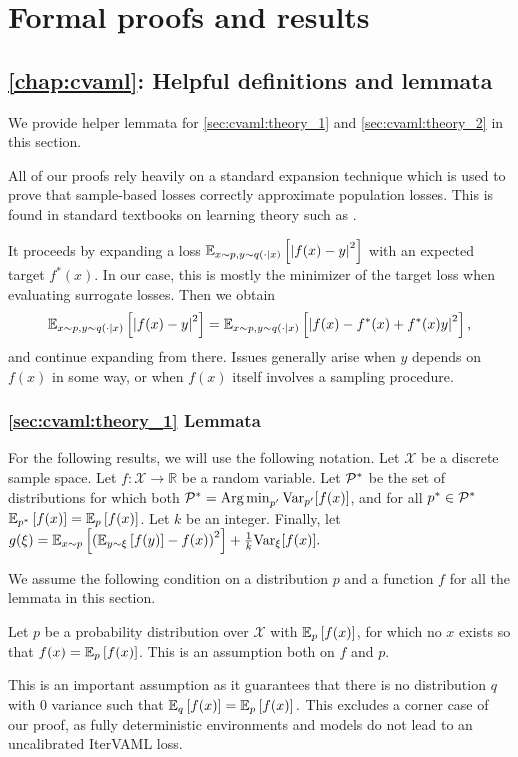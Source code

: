\chapter{Formal proofs and results}
\label{app:proofs}


\section{\autoref{chap:cvaml}: Helpful definitions and lemmata}
\label{app:formal:cvaml}

We provide helper lemmata for \autoref{sec:cvaml:theory_1} and \autoref{sec:cvaml:theory_2} in this section.

All of our proofs rely heavily on a standard expansion technique which is used to prove that sample-based losses correctly approximate population losses.
This is found in standard textbooks on learning theory such as \citet{gyrfi2002adt}. 

It proceeds by expanding a loss $\EEX{x\sim p, y\sim q(\cdot|x)}{\left|f(x) - y\right|^2}$ with an expected target $f^*(x)$.
In our case, this is mostly the minimizer of the target loss when evaluating surrogate losses.
Then we obtain $$\EEX{x\sim p, y\sim q(\cdot|x)}{\left|f(x) - y\right|^2} = \EEX{x\sim p, y\sim q(\cdot|x)}{\left|f(x) - f^*(x) + f^*(x) y\right|^2},$$
and continue expanding from there.
Issues generally arise when $y$ depends on $f(x)$ in some way, or when $f(x)$ itself involves a sampling procedure.

\subsection{\autoref{sec:cvaml:theory_1} Lemmata}

For the following results, we will use the following notation.
Let $\mathcal{X}$ be a discrete sample space. 
Let $f: \mathcal{X} \rightarrow \mathbb{R}$ be a random variable.
Let $\P^*$ be the set of distributions for which both $\P^* = \Argmin_{p'} \mathrm{Var}_{p'}[f(x)]$, and for all $p^* \in \P^*$ $\EEX{p^*}{f(x)} = \EEX{p}{f(x)}$.
Let $k$ be an integer.
Finally, let $g(\xi) = \EEX{x \sim p}{\left(\EEX{y \sim \xi}{f(y)} - f(x)\right)^2} + \frac{1}{k}\mathrm{Var}_\xi[f(x)].$

We assume the following condition on a distribution $p$ and a function $f$ for all the lemmata in this section.
\begin{assumption}
Let $p$ be a probability distribution over $\mathcal{X}$ with $\EEX{p}{f(x)}$, for which no $x$ exists so that $f(x) = \EEX{p}{f(x)}$.
This is an assumption both on $f$ and $p$.
\end{assumption}
This is an important assumption as it guarantees that there is no distribution $q$ with $0$ variance such that $\EEX{q}{f(x)} = \EEX{p}{f(x)}.$
This excludes a corner case of our proof, as fully deterministic environments and models do not lead to an uncalibrated IterVAML loss.

